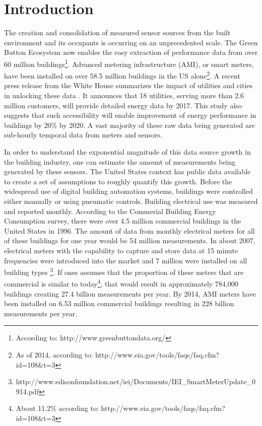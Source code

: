 \section{Introduction}
\label{sec:intro}

The creation and consolidation of measured sensor sources from the built environment and its occupants is occurring on an unprecedented scale. The Green Button Ecosystem now enables the easy extraction of performance data from over 60 million buildings\footnote{According to: http://www.greenbuttondata.org/}. Advanced metering infrastructure (AMI), or smart meters, have been installed on over 58.5 million buildings in the US alone\footnote{As of 2014, according to: http://www.eia.gov/tools/faqs/faq.cfm?id=108&t=3}. A recent press release from the White House summarizes the impact of utilities and cities in unlocking these data \cite{the_white_house_fact_2016}. It announces that 18 utilities, serving more than 2.6 million customers, will provide detailed energy data by 2017. This study also suggests that such accessibility will enable improvement of energy performance in buildings by 20\% by 2020. A vast majority of these raw data being generated are sub-hourly temporal data from meters and sensors.

In order to understand the exponential magnitude of this data source growth in the building industry, one can estimate the amount of measurements being generated by these sensors. The United States context has public data available to create a set of assumptions to roughly quantify this growth. Before the widespread use of digital building automation systems, buildings were controlled either manually or using pneumatic controls. Building electrical use was measured and reported monthly. According to the Commerial Building Energy Consumption survey, there were over 4.5 million commercial buildings in the United States in 1996. The amount of data from monthly electrical meters for all of these buildings for one year would be 54 million measurements. In about 2007, electrical meters with the capability to capture and store data at 15 minute frequencies were introduced into the market and 7 million were installed on all building types \footnote{http://www.edisonfoundation.net/iei/Documents/IEI_SmartMeterUpdate_0914.pdf}. If ones assumes that the proportion of these meters that are commercial is similar to today\footnote{About 11.2\% according to: http://www.eia.gov/tools/faqs/faq.cfm?id=108&t=3}, that would result in approximately 784,000 buildings creating 27.4 billion measurements per year. By 2014, AMI meters have been installed on 6.53 million commercial buildings resulting in 228 billion measurements per year.
